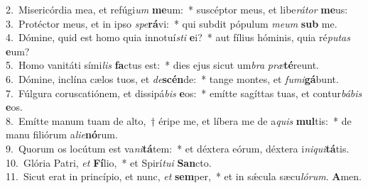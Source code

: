 {2.~}Misericórdia mea, et refúgi\textit{um} \textbf{me}um:~* suscéptor meus, et libe\textit{rá}\textit{tor} \textbf{me}us:\\
{3.~}Protéctor meus, et in ipso \textit{spe}\textbf{rá}vi:~* qui subdit pópulum \textit{me}\textit{um} \textbf{sub} me.\\
{4.~}Dómine, quid est homo quia innotuí\textit{sti} \textbf{e}i?~* aut fílius hóminis, quia ré\textit{pu}\textit{tas} \textbf{e}um?\\
{5.~}Homo vanitáti sími\textit{lis} \textbf{fa}ctus est:~* dies ejus sicut um\textit{bra} \textit{præ}\textbf{té}reunt.\\
{6.~}Dómine, inclína cælos tuos, et \textit{de}\textbf{scén}de:~* tange montes, et \textit{fu}\textit{mi}\textbf{gá}bunt.\\
{7.~}Fúlgura coruscatiónem, et dissipá\textit{bis} \textbf{e}os:~* emítte sagíttas tuas, et contur\textit{bá}\textit{bis} \textbf{e}os.\\
{8.~}Emítte manum tuam de alto,~† éripe me, et líbera me de a\textit{quis} \textbf{mul}tis:~* de manu filiórum a\textit{li}\textit{e}\textbf{nó}rum.\\
{9.~}Quorum os locútum est va\textit{ni}\textbf{tá}tem:~* et déxtera eórum, déxtera i\textit{ni}\textit{qui}\textbf{tá}tis.\\
{10.~}Glória Patri, \textit{et} \textbf{Fí}lio,~* et Spirí\textit{tu}\textit{i} \textbf{San}cto.\\
{11.~}Sicut erat in princípio, et nunc, \textit{et} \textbf{sem}per,~* et in sǽcula sæcu\textit{ló}\textit{rum}. \textbf{A}men.\\
